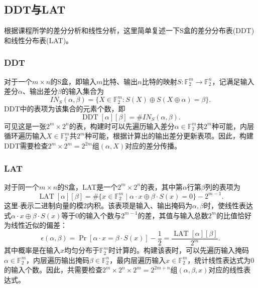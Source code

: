 \subsection{DDT与LAT}
根据课程所学的差分分析和线性分析，这里简单复述一下S盒的差分分布表(DDT)和线性分布表(LAT)。

\subsubsection{DDT}
对于一个$m \times n$的S盒，即输入$m$比特、输出$n$比特的映射$S:\mathbb{F}_2^m \to \mathbb{F}_2^n$，记满足输入差分$\alpha$、输出差分$\beta$的输入集合为
$$
IN_S(\alpha ,\beta) = \{X \in \mathbb{F}_2^m :S(X) \oplus S(X \oplus \alpha) = \beta\}.
$$
DDT中的表项为该集合的元素个数，即
$$
\operatorname{DDT}[\alpha][\beta] = \# IN_S(\alpha,\beta).
$$
可见这是一张$2^m \times 2^n$的表，构建时可以先遍历输入差分$\alpha \in \mathbb{F}_2^m$共$2^m$种可能，内层循环遍历输入$X \in \mathbb{F}_2^m$共$2^m$种可能，根据计算出的输出差分更新表项。因此，构建DDT需要检查$2^m \times 2^m = 2^{2m}$组$(\alpha,X)$对应的差分传播。

\subsubsection{LAT}

对于同一个$m \times n$的S盒，LAT是一个$2^m \times 2^n$的表，其中第$\alpha$行第$\beta$列的表项为
$$
\operatorname{LAT}[\alpha][\beta]
=\#\{x\in\mathbb{F}_2^m\mid \alpha\cdot x\oplus\beta\cdot S(x)=0\}-2^{m-1}.
$$
这里$\cdot$表示二进制向量的模$2$内积。该表项是输入、输出掩码为$\alpha,\beta$时，使线性表达式$\alpha\cdot x\oplus\beta\cdot S(x)$等于$0$的输入个数与$2^{m-1}$的差，其值与输入总数$2^m$的比值恰好为线性近似的偏差：
$$
\epsilon(\alpha,\beta)
=\Pr[\alpha\cdot x=\beta\cdot S(x)]-\frac{1}{2}
=\frac{\operatorname{LAT}[\alpha][\beta]}{2^m}.
$$
其中概率是在输入$x$均匀分布于$\mathbb{F}_2^m$时计算的。构建该表时，可以先遍历输入掩码$\alpha\in\mathbb{F}_2^m$，内层遍历输出掩码$\beta\in\mathbb{F}_2^n$，最内层遍历输入$x\in\mathbb{F}_2^m$，统计线性表达式为$0$的输入个数。因此，共需要检查$2^m\times2^n\times2^m=2^{2m+n}$组$(\alpha,\beta,x)$对应的线性表达式。

